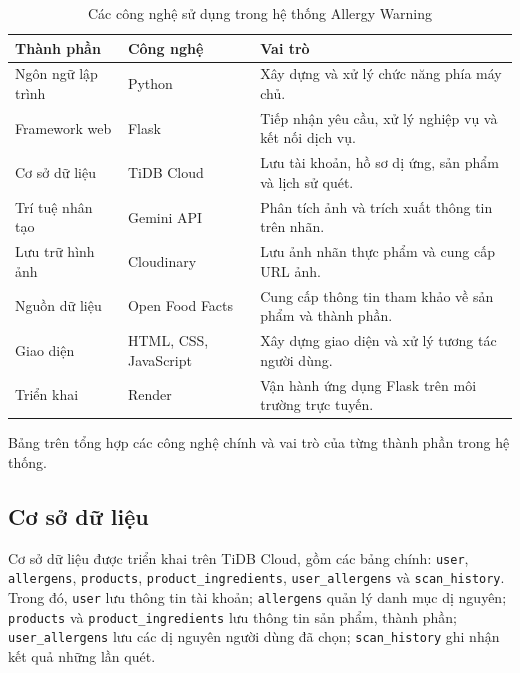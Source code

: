 \begin{table}[htbp]
	\centering
	\caption{Các công nghệ sử dụng trong hệ thống Allergy Warning}
	\label{tab:ch4-cong-nghe}
	\small
	\renewcommand{\arraystretch}{1.2}
	\begin{tabularx}{\textwidth}{|>{\raggedright\arraybackslash}p{2.8cm}|>{\raggedright\arraybackslash}p{3.2cm}|>{\raggedright\arraybackslash}X|}
		\hline
		\textbf{Thành phần} & \textbf{Công nghệ} & \textbf{Vai trò} \\ \hline
		Ngôn ngữ lập trình & Python & Xây dựng và xử lý chức năng phía máy chủ. \\ \hline
		Framework web & Flask & Tiếp nhận yêu cầu, xử lý nghiệp vụ và kết nối dịch vụ. \\ \hline
		Cơ sở dữ liệu & TiDB Cloud & Lưu tài khoản, hồ sơ dị ứng, sản phẩm và lịch sử quét. \\ \hline
		Trí tuệ nhân tạo & Gemini API & Phân tích ảnh và trích xuất thông tin trên nhãn. \\ \hline
		Lưu trữ hình ảnh & Cloudinary & Lưu ảnh nhãn thực phẩm và cung cấp URL ảnh. \\ \hline
		Nguồn dữ liệu & Open Food Facts & Cung cấp thông tin tham khảo về sản phẩm và thành phần. \\ \hline
		Giao diện & HTML, CSS, JavaScript & Xây dựng giao diện và xử lý tương tác người dùng. \\ \hline
		Triển khai & Render & Vận hành ứng dụng Flask trên môi trường trực tuyến. \\ \hline
	\end{tabularx}
\end{table}

Bảng trên tổng hợp các công nghệ chính và vai trò của từng thành phần trong hệ thống.

\subsection{Cơ sở dữ liệu}

Cơ sở dữ liệu được triển khai trên TiDB Cloud, gồm các bảng chính: \texttt{user}, \texttt{allergens}, \texttt{products}, \texttt{product\_ingredients}, \texttt{user\_allergens} và \texttt{scan\_history}. Trong đó, \texttt{user} lưu thông tin tài khoản; \texttt{allergens} quản lý danh mục dị nguyên; \texttt{products} và \texttt{product\_ingredients} lưu thông tin sản phẩm, thành phần; \texttt{user\_allergens} lưu các dị nguyên người dùng đã chọn; \texttt{scan\_history} ghi nhận kết quả những lần quét.

